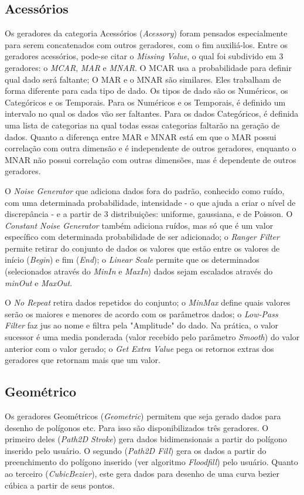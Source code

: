 \documentclass[
	12pt,				%
	openright,			%
	twoside,			%
	a4paper,			%
	english,			%
	brazil				%
	]{abntex2}
\begin{document}
		\subsection{Acessórios}
			Os geradores da categoria Acessórios (\emph{Acessory}) foram pensados especialmente para serem concatenados com outros geradores, com o fim auxiliá-los.
			Entre os geradores acessórios, pode-se citar o \emph{Missing Value}, o qual foi subdivido em 3 geradores: o \emph{MCAR}, \emph{MAR} e \emph{MNAR}.
			O MCAR usa a probabilidade para definir qual dado será faltante;
			O MAR e o MNAR são similares. 
			Eles trabalham de forma diferente para cada tipo de dado.
			Os tipos de dado são os Numéricos, os Categóricos e os Temporais.
			Para os Numéricos e os Temporais, é definido um intervalo no qual os dados vão ser faltantes.
			Para os dados Categóricos, é definida uma lista de categorias na qual todas essas categorias faltarão na geração de dados.
			Quanto a diferença entre MAR e MNAR está em que o MAR possui correlação com outra dimensão e é independente de outros geradores,
			 enquanto o MNAR não possui correlação com outras dimensões, mas é dependente de outros geradores.   
			\par
				O \emph{Noise Generator} que adiciona dados fora do padrão, conhecido como ruído, com uma determinada probabilidade, intensidade - o que ajuda a criar o nível de discrepância - e a partir de 3 distribuições: uniforme, gaussiana, e de Poisson.
				O \emph{Constant Noise Generator} também adiciona ruídos, mas só que é um valor específico com determinada probabilidade de ser adicionado;
				o \emph{Ranger Filter} permite retirar do conjunto de dados os valores que estão entre os valores de início (\emph{Begin}) e fim (\emph{End});
				o \emph{Linear Scale} permite que os determinados (selecionados através do \emph{MinIn} e \emph{MaxIn}) dados sejam escalados através do \emph{minOut} e \emph{MaxOut}.
			\par
			O \emph{No Repeat} retira dados repetidos do conjunto;
				o \emph{MinMax} define quais valores serão os maiores e menores de acordo com os parâmetros dados;
				o \emph{Low-Pass Filter} faz jus ao nome e filtra pela "Amplitude" do dado. Na prática, o valor sucessor é uma media ponderada (valor recebido pelo parâmetro \emph{Smooth}) do valor anterior com o valor gerado;
				o \emph{Get Extra Value} pega os retornos extras dos geradores que retornam mais que um valor.
		\subsection{Geométrico}
			Os geradores Geométricos (\emph{Geometric}) permitem que seja gerado dados para desenho de polígonos etc.
			Para isso são disponibilizados três geradores.
			O primeiro deles (\emph{Path2D Stroke}) gera dados bidimensionais a partir do polígono inserido pelo usuário.
			O segundo (\emph{Path2D Fill}) gera os dados a partir do preenchimento do polígono inserido  (ver algoritmo \emph{Floodfill}) pelo usuário.
			Quanto ao terceiro (\emph{CubicBezier}), este gera dados para desenho de uma curva bezier cúbica a partir de seus pontos.
\end{document}

